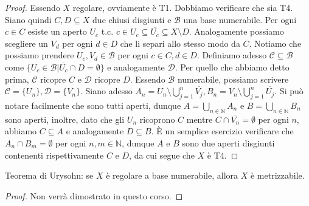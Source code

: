 \begin{proof}
  Essendo $X$ regolare, ovviamente è T1. Dobbiamo verificare che sia T4. Siano quindi $C, D \subseteq X$ due chiusi disgiunti e $\mathcal{B}$ una base numerabile. Per ogni $c \in C$ esiste un aperto $U_c$ t.c. $c \in U_c \subseteq  \overline{U_c} \subseteq X \setminus D$. Analogamente possiamo
  scegliere un $V_d$ per ogni $d \in D$ che li separi allo stesso modo da $C$. Notiamo che possiamo prendere $U_c, V_d \in \mathcal{B}$ per ogni $c \in C, d \in D$. Definiamo adesso $\mathcal{C} \subseteq \mathcal{B}$ come $\{U_c \in \mathcal{B} | \overline{U_c} \cap D=\emptyset\}$ e analogamente $\mathcal{D}$.
  Per quello che abbiamo detto prima, $\mathcal{C}$ ricopre $C$ e $\mathcal{D}$ ricopre $D$. Essendo $\mathcal{B}$ numerabile, possiamo scrivere $\mathcal{C}=\{U_n\}, \mathcal{D}=\{V_n\}$. Siano adesso $\displaystyle A_n= U_n \setminus \bigcup_{j=1}^n \overline{V_j}, B_n =V_n \setminus \bigcup_{j=1}^n \overline{U_j}$. Si può notare facilmente che sono tutti
  aperti, dunque $\displaystyle A= \bigcup_{n \in \mathbb{N}} A_n$ e $\displaystyle B= \bigcup_{n \in \mathbb{N}} B_n$ sono aperti, inoltre, dato che gli $U_n$ ricoprono $C$ mentre $C \cap \overline{V_n}=\emptyset$ per ogni $n$, abbiamo $C \subseteq A$ e analogamente $D \subseteq B$. È un semplice
  esercizio verificare che $A_n \cap B_m = \emptyset$ per ogni $n, m \in \mathbb{N}$, dunque $A$ e $B$ sono due aperti disgiunti contenenti rispettivamente $C$ e $D$, da cui segue che $X$ è T4.
\end{proof}

\begin{thm}
  Teorema di Urysohn: se $X$ è regolare a base numerabile, allora $X$ è metrizzabile.
\end{thm}

\begin{proof}
  Non verrà dimostrato in questo corso.
\end{proof}

